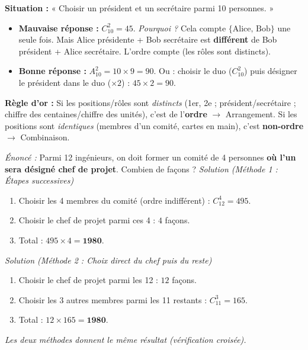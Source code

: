 \documentclass[11pt]{article}
\begin{document}
\begin{attention}
\textbf{Situation :} « Choisir un président et un secrétaire parmi 10 personnes. »
\begin{itemize}
    \item \textbf{Mauvaise réponse :} $C_{10}^2 = 45$. \emph{Pourquoi ?} Cela compte $\{\text{Alice, Bob}\}$ une seule fois. Mais Alice présidente + Bob secrétaire est \textbf{différent} de Bob président + Alice secrétaire. L'ordre compte (les rôles sont distincts).
    \item \textbf{Bonne réponse :} $A_{10}^2 = 10 \times 9 = 90$. Ou : choisir le duo ($C_{10}^2$) puis désigner le président dans le duo ($\times 2$) : $45 \times 2 = 90$.
\end{itemize}
\textbf{Règle d'or :} Si les positions/rôles sont \emph{distincts} (1er, 2e ; président/secrétaire ; chiffre des centaines/chiffre des unités), c'est de l'\textbf{ordre} $\rightarrow$ Arrangement. Si les positions sont \emph{identiques} (membres d'un comité, cartes en main), c'est \textbf{non-ordre} $\rightarrow$ Combinaison.
\end{attention}

\begin{exoresolu}
\emph{Énoncé :} Parmi 12 ingénieurs, on doit former un comité de 4 personnes \textbf{où l'un sera désigné chef de projet}. Combien de façons ?
\tcblower
\emph{Solution (Méthode 1 : Étapes successives)}
\begin{enumerate}
    \item Choisir les 4 membres du comité (ordre indifférent) : $C_{12}^4 = 495$.
    \item Choisir le chef de projet parmi ces 4 : $4$ façons.
    \item Total : $495 \times 4 = \mathbf{1980}$.
\end{enumerate}
\emph{Solution (Méthode 2 : Choix direct du chef puis du reste)}
\begin{enumerate}
    \item Choisir le chef de projet parmi les 12 : $12$ façons.
    \item Choisir les 3 autres membres parmi les 11 restants : $C_{11}^3 = 165$.
    \item Total : $12 \times 165 = \mathbf{1980}$.
\end{enumerate}
\emph{Les deux méthodes donnent le même résultat (vérification croisée).}
\end{exoresolu}
\end{document}
